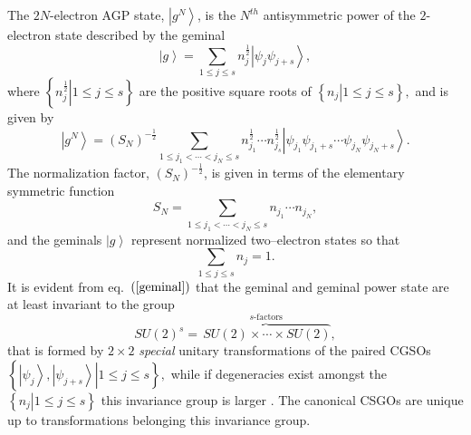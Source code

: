 \documentclass[aps,preprint]{revtex4}%
\begin{document}
The $2N$-electron AGP state, $\left\vert g^{N}\right\rangle $, is the $N^{th}$
antisymmetric power of the $2$-electron state described by the geminal
\begin{equation}
\left\vert g\right\rangle =\sum_{1\leq j\leq s}n_{j}^{\frac{1}{2}}\left\vert
\psi_{j}\psi_{j+s}\right\rangle ,\label{geminal}%
\end{equation}
where $\left\{  \left.  n_{j}^{\frac{1}{2}}\right\vert 1\leq j\leq s\right\}
$ are the positive square roots of $\left\{  \left.  n_{j}\right\vert 1\leq
j\leq s\right\}  ,$ and is given by \cite{Weiner&ortiz04}
\begin{equation}
\left\vert g^{N}\right\rangle =\left(  S_{N}\right)  ^{-\frac{1}{2}}%
\sum_{1\leq j_{1}<\cdots<j_{N}\leq s}n_{j_{1}}^{\frac{1}{2}}\cdots n_{j_{s}%
}^{\frac{1}{2}}\left\vert \psi_{j_{1}}\psi_{j_{1}+s}\cdots\psi_{j_{N}}%
\psi_{j_{N}+s}\right\rangle .\label{agp}%
\end{equation}
The normalization factor, $\left(  S_{N}\right)  ^{-\frac{1}{2}}$, is given in
terms of the elementary symmetric function
\begin{equation}
S_{N}=\sum_{1\leq j_{1}<\cdots<j_{N}\leq s}n_{j_{1}}\cdots n_{j_{N}},
\end{equation}
and the geminals $\left\vert g\right\rangle $ represent normalized
two--electron states so that
\begin{equation}
\sum_{1\leq j\leq s}n_{j}=1.
\end{equation}
It is evident from eq.\ $\left(  \ref{geminal}\right)  $ that the geminal and
geminal power state are at least invariant to the group
\begin{equation}
SU\left(  2\right)  ^{s}=\overset{s\text{-factors}}{\overbrace{\,SU\left(
2\right)  \times\cdots\times SU\left(  2\right)  }},
\end{equation}
that is formed by $2\times2$ \emph{special} unitary transformations of the
paired CGSOs $\left\{  \left.  \left\vert \psi_{j}\right\rangle ,\left\vert
\psi_{j+s}\right\rangle \right\vert 1\leq j\leq s\right\}  ,$ while if
degeneracies exist amongst the $\left\{  \left.  n_{j}\right\vert 1\leq j\leq
s\right\}  $ this invariance group is larger \cite{AGPCoherent}. The canonical
CSGOs are unique up to transformations belonging this invariance group.
\end{document}
